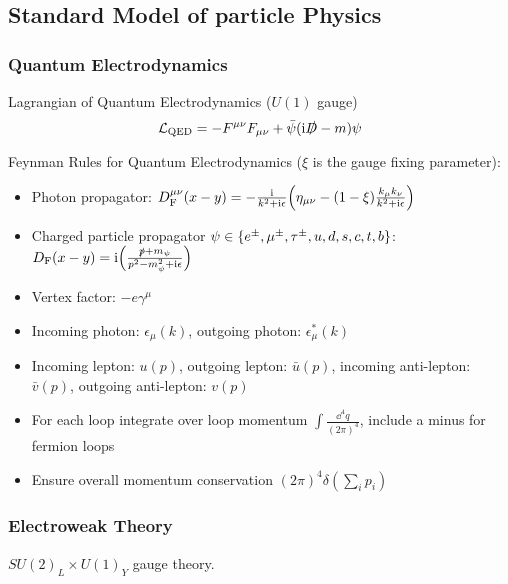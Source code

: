 	\subsection{Standard Model of particle Physics}

		\subsubsection{Quantum Electrodynamics}
			Lagrangian of Quantum Electrodynamics ($U(1)$ gauge)
			\begin{equation}
				\mathcal{L}_\mathrm{QED} = -F^{\mu\nu}F_{\mu\nu} + \bar{\psi}(\mathrm{i}\slashed{D}-m)\psi
			\end{equation}

			\noindent
			Feynman Rules for Quantum Electrodynamics ($\xi$ is the gauge fixing parameter):
			\begin{itemize}\itemsep -0pt
				\item Photon propagator: $D_\text{F}^{\mu\nu}(x-y) = -\frac{\mathrm{i}}{k^2+\mathrm{i}\epsilon} \qty(\eta_{\mu\nu}-(1-\xi)\frac{k_\mu k_\nu}{k^2+\mathrm{i}\epsilon} )$
				\item Charged particle propagator $\psi \in \qty{e^\pm, \mu^\pm ,\tau^\pm, u,d,s,c,t,b}$: $D_\text{F}(x-y) = \mathrm{i}\qty(\frac{\slashed{p}+m_\psi}{p^2-m_\psi^2+\mathrm{i}\epsilon})$
				\item Vertex factor: $-e\gamma^\mu$
				\item Incoming photon: $\epsilon_\mu(k)$, outgoing photon: $\epsilon^{*}_\mu(k)$
				\item Incoming lepton: $u(p)$, outgoing lepton: $\bar{u}(p)$, incoming anti-lepton: $\bar{v}(p)$, outgoing anti-lepton: $v(p)$
				\item For each loop integrate over loop momentum $\int \frac{\dd^4 q}{(2\pi)^4}$, include a minus for fermion loops
				\item Ensure overall momentum conservation $(2\pi)^4 \delta(\sum_i p_i)$
			\end{itemize}

		\subsubsection{Electroweak Theory}
			$SU(2)_L \times U(1)_Y$ gauge theory.


